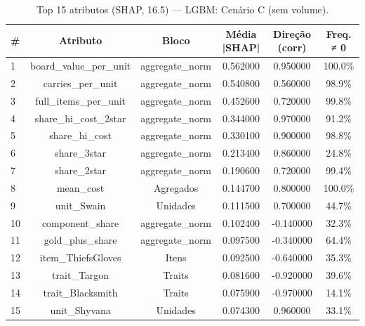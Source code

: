 \begin{table}[htbp]
\caption{Top 15 atributos (SHAP, 16.5) — LGBM: Cenário C (sem volume).}
\label{tab:toplgbm_C}
\centering
\small
\begin{tabular}{lccccc}
\toprule
\# & Atributo & Bloco & Média |SHAP| & Direção (corr) & Freq. ≠ 0 \\
\midrule
1 & board\_value\_per\_unit & aggregate\_norm & 0.562000 & 0.950000 & 100.0\% \\
2 & carries\_per\_unit & aggregate\_norm & 0.540800 & 0.560000 & 98.9\% \\
3 & full\_items\_per\_unit & aggregate\_norm & 0.452600 & 0.720000 & 99.8\% \\
4 & share\_hi\_cost\_2star & aggregate\_norm & 0.344000 & 0.970000 & 91.2\% \\
5 & share\_hi\_cost & aggregate\_norm & 0.330100 & 0.900000 & 98.8\% \\
6 & share\_3star & aggregate\_norm & 0.213400 & 0.860000 & 24.8\% \\
7 & share\_2star & aggregate\_norm & 0.190600 & 0.720000 & 99.4\% \\
8 & mean\_cost & Agregados & 0.144700 & 0.800000 & 100.0\% \\
9 & unit\_Swain & Unidades & 0.111500 & 0.700000 & 44.7\% \\
10 & component\_share & aggregate\_norm & 0.102400 & -0.140000 & 32.3\% \\
11 & gold\_plus\_share & aggregate\_norm & 0.097500 & -0.340000 & 64.4\% \\
12 & item\_ThiefsGloves & Itens & 0.092500 & -0.640000 & 35.3\% \\
13 & trait\_Targon & Traits & 0.081600 & -0.920000 & 39.6\% \\
14 & trait\_Blacksmith & Traits & 0.075900 & -0.970000 & 14.1\% \\
15 & unit\_Shyvana & Unidades & 0.074300 & 0.960000 & 33.1\% \\
\bottomrule
\end{tabular}
\end{table}
